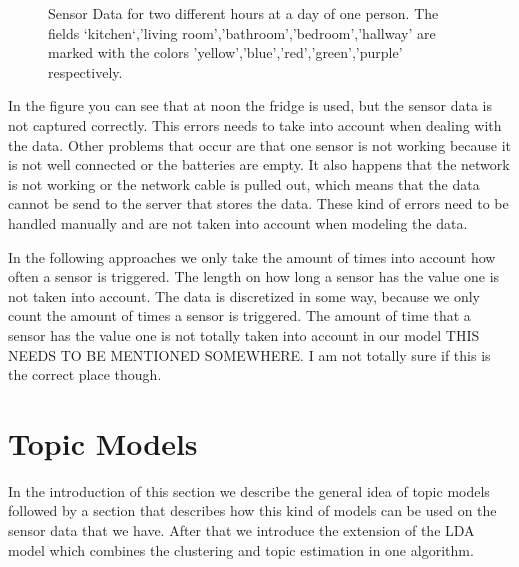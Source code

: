 \documentclass[11pt,a4paper]{article}
\begin{document}
\begin{figure}[h!]
\begin{subfigure}[b]{0.45\textwidth}
  \end{subfigure}
  \caption{Sensor Data for two different hours at a day of one person. The fields `kitchen`,'living room','bathroom','bedroom','hallway' are marked with the colors 'yellow','blue','red','green','purple' respectively.}
  \label{fig:PlaineSensorData}
\end{figure}

In the figure you can see that at noon the fridge is used, but the sensor data is not captured correctly. This errors needs to take into account when dealing with the data. Other problems that occur are that one sensor is not working because it is not well connected or the batteries are empty. It also happens that the network is not working or the network cable is pulled out, which means that the data cannot be send to the server that stores the data. These kind of errors need to be handled manually and are not taken into account when modeling the data.

In the following approaches we only take the amount of times into account how often a sensor is triggered. The length on how long a sensor has the value one is not taken into account.
The data is discretized in some way, because we only count the amount of times a sensor is triggered. The amount of time that a sensor has the value one is not totally taken into account in our model
THIS NEEDS TO BE MENTIONED SOMEWHERE. I am not totally sure if this is the correct place though.

\pagebreak
\section{Topic Models}
\label{sec:TopicModels}
In the introduction of this section we describe the general idea of topic models followed by a section that describes how this kind of models can be used on the sensor data that we have. After that we introduce the extension of the LDA model which combines the clustering and topic estimation in one algorithm.
\end{document}
